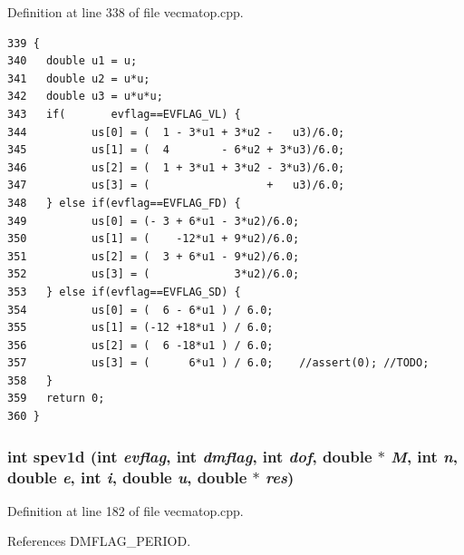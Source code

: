 Definition at line 338 of file vecmatop.cpp.

\footnotesize\begin{verbatim}339 {
340   double u1 = u;
341   double u2 = u*u;
342   double u3 = u*u*u;
343   if(       evflag==EVFLAG_VL) {
344          us[0] = (  1 - 3*u1 + 3*u2 -   u3)/6.0;
345          us[1] = (  4        - 6*u2 + 3*u3)/6.0;
346          us[2] = (  1 + 3*u1 + 3*u2 - 3*u3)/6.0;
347          us[3] = (                  +   u3)/6.0;
348   } else if(evflag==EVFLAG_FD) {
349          us[0] = (- 3 + 6*u1 - 3*u2)/6.0;
350          us[1] = (    -12*u1 + 9*u2)/6.0;
351          us[2] = (  3 + 6*u1 - 9*u2)/6.0;
352          us[3] = (             3*u2)/6.0;
353   } else if(evflag==EVFLAG_SD) {
354          us[0] = (  6 - 6*u1 ) / 6.0;
355          us[1] = (-12 +18*u1 ) / 6.0;
356          us[2] = (  6 -18*u1 ) / 6.0;
357          us[3] = (      6*u1 ) / 6.0;    //assert(0); //TODO;
358   }  
359   return 0;
360 }
\end{verbatim}\normalsize 


\subsubsection{\setlength{\rightskip}{0pt plus 5cm}int spev1d (int {\em evflag}, int {\em dmflag}, int {\em dof}, double $\ast$ {\em M}, int {\em n}, double {\em e}, int {\em i}, double {\em u}, double $\ast$ {\em res})}\label{vecmatop_8hpp_59ca1776ee301a72ccfb5105b3a3edfd_59ca1776ee301a72ccfb5105b3a3edfd}




Definition at line 182 of file vecmatop.cpp.

References DMFLAG\_\-PERIOD.

